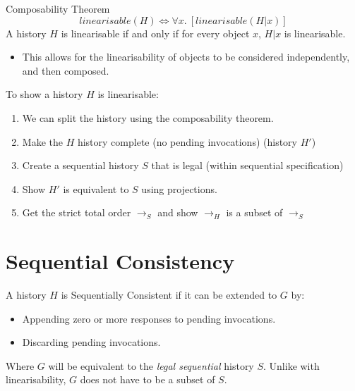 \begin{definitionbox}{Composability Theorem}
    \[linearisable(H) \Leftrightarrow \forall x. \ [linearisable(H|x)]\]
    A history $H$ is linearisable if and only if for every object $x$, $H|x$ is linearisable.
    \begin{itemize}
        \item This allows for the linearisability of objects to be considered independently, and then composed.
    \end{itemize}
\end{definitionbox}
To show a history $H$ is linearisable:
\begin{enumerate}
    \item We can split the history using the composability theorem.
    \item Make the $H$ history complete (no pending invocations) (history $H'$)
    \item Create a sequential history $S$ that is legal (within sequential specification)
    \item Show $H'$ is equivalent to $S$ using projections.
    \item Get the strict total order $\to_S$ and show $\to_H$ is a subset of $\to_S$
\end{enumerate}


\section{Sequential Consistency}
A history $H$ is Sequentially Consistent if it can be extended to $G$ by:
\begin{itemize}
    \item Appending zero or more responses to pending invocations.
    \item Discarding pending invocations.
\end{itemize}
Where $G$ will be equivalent to the \textit{legal sequential} history $S$. Unlike with linearisability, $G$ does not have to be a subset of $S$.
